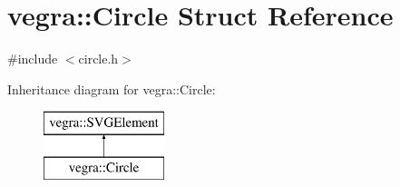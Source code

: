 \hypertarget{structvegra_1_1Circle}{}\section{vegra\+:\+:Circle Struct Reference}
\label{structvegra_1_1Circle}


{\ttfamily \#include $<$circle.\+h$>$}

Inheritance diagram for vegra\+:\+:Circle\+:\begin{figure}[H]
\begin{center}
\leavevmode
\includegraphics[height=2.000000cm]{structvegra_1_1Circle}
\end{center}
\end{figure}

